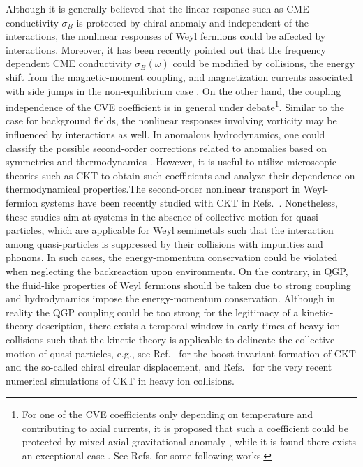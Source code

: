 \documentclass[aps,prd,showkeys,preprint,amsmath,amssymb,nofootinbib]{revtex4-1}
\begin{document}
Although it is generally believed that the linear response such as CME conductivity $\sigma_B$ is protected by chiral anomaly and independent of the interactions, the nonlinear responses of Weyl fermions could be affected by interactions. Moreover, it has been recently pointed out that the frequency dependent CME conductivity $\sigma_B(\omega)$ could be modified by collisions, the energy shift from the magnetic-moment coupling, and magnetization currents associated with side jumps in the non-equilibrium case \cite{Kharzeev:2009pj,Satow:2014lva,Kharzeev:2016sut}. On the other hand, the coupling independence of the CVE coefficient is in general under debate\footnote{For one of the CVE coefficients only depending on temperature and contributing to axial currents, it is proposed that such a coefficient could be protected by mixed-axial-gravitational anomaly \cite{Landsteiner2011,Landsteiner:2011cp}, while it is found there exists an exceptional case \cite{Hou2012,Golkar:2012kb}. See Refs.\cite{Chowdhury:2015pba,Golkar:2015oxw,Chowdhury:2016cmh} for some following works.}. Similar to the case for background fields, the nonlinear responses involving vorticity may be influenced by interactions as well. In anomalous hydrodynamics, one could classify the possible second-order corrections related to anomalies based on symmetries and thermodynamics \cite{Kharzeev:2011ds}. However, it is useful to utilize microscopic theories such as CKT to obtain such coefficients and analyze their dependence on thermodynamical properties.The second-order nonlinear transport in Weyl-fermion systems have been recently studied with CKT in Refs.~\cite{Gorbar:2016qfh,Chen:2016xtg,Gorbar:2017cwv}. Nonetheless, these studies aim at systems in the absence of collective motion for quasi-particles, which are applicable for Weyl semimetals such that the interaction among quasi-particles is suppressed by their collisions with impurities and phonons. In such cases, the energy-momentum conservation could be violated when neglecting the backreaction upon environments. On the contrary, in QGP, the fluid-like properties of Weyl fermions should be taken due to strong coupling and hydrodynamics impose the energy-momentum conservation. Although in reality the QGP coupling could be too strong for the legitimacy of a kinetic-theory description, there exists a temporal window in early times of heavy ion collisions such that the kinetic theory is applicable to delineate the collective motion of quasi-particles, e.g., see Ref.~\cite{Ebihara:2017suq} for the boost invariant formation of CKT and the so-called chiral circular displacement, and Refs.~\cite{Sun:2016nig,Huang:2017tsq} for the very recent numerical simulations of CKT in heavy ion collisions.
\end{document}
